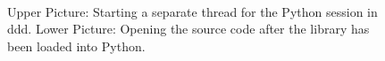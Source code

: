 \begin{figure}[htbp]
   \\
  \caption{Upper Picture: Starting a separate thread for the Python session in ddd.
           Lower Picture: Opening the source code after the \dolfin library has been loaded into Python.}
  \label{figure12}
\end{figure}
